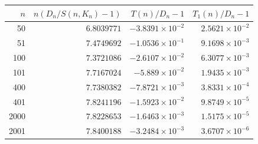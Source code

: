\begin{tabular}{r r r r}
\toprule
$n$ & $n(D_n/S(n,K_n)-1)$ & $T(n)/D_n-1$ & $T_1(n)/D_n-1$ \\
\midrule
50 & $6.8039771$ & $-3.8391\times10^{-2}$ & $2.5621\times10^{-2}$ \\
51 & $7.4749692$ & $-1.0536\times10^{-1}$ & $9.1698\times10^{-3}$ \\
100 & $7.3721086$ & $-2.6107\times10^{-2}$ & $6.3077\times10^{-3}$ \\
101 & $7.7167024$ & $-5.889\times10^{-2}$ & $1.9435\times10^{-3}$ \\
400 & $7.7380382$ & $-7.8721\times10^{-3}$ & $3.8331\times10^{-4}$ \\
401 & $7.8241196$ & $-1.5923\times10^{-2}$ & $9.8749\times10^{-5}$ \\
2000 & $7.8228653$ & $-1.6463\times10^{-3}$ & $1.5175\times10^{-5}$ \\
2001 & $7.8400188$ & $-3.2484\times10^{-3}$ & $3.6707\times10^{-6}$ \\
\bottomrule
\end{tabular}
